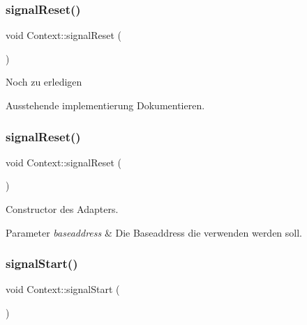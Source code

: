 \subsubsection{\texorpdfstring{signal\+Reset()}{signalReset()}\hspace{0.1cm}{\footnotesize\ttfamily [1/2]}}
{\footnotesize\ttfamily void Context\+::signal\+Reset (\begin{DoxyParamCaption}{ }\end{DoxyParamCaption})}

\begin{DoxyRefDesc}{Noch zu erledigen}
\item[\hyperlink{todo__todo000011}{Noch zu erledigen}]Ausstehende implementierung Dokumentieren. \end{DoxyRefDesc}
\hypertarget{class_context_a59ea683658907374dbe23125c11b1e93}{}\label{class_context_a59ea683658907374dbe23125c11b1e93} 
\subsubsection{\texorpdfstring{signal\+Reset()}{signalReset()}\hspace{0.1cm}{\footnotesize\ttfamily [2/2]}}
{\footnotesize\ttfamily void Context\+::signal\+Reset (\begin{DoxyParamCaption}{ }\end{DoxyParamCaption})}

Constructor des Adapters.


\begin{DoxyParams}{Parameter}
{\em baseaddress} & Die Baseaddress die verwenden werden soll. \\
\hline
\end{DoxyParams}
\hypertarget{class_context_a9fbe4299614bae2f11e92ed56cde640c}{}\label{class_context_a9fbe4299614bae2f11e92ed56cde640c} 
\subsubsection{\texorpdfstring{signal\+Start()}{signalStart()}\hspace{0.1cm}{\footnotesize\ttfamily [1/2]}}
{\footnotesize\ttfamily void Context\+::signal\+Start (\begin{DoxyParamCaption}{ }\end{DoxyParamCaption})}

